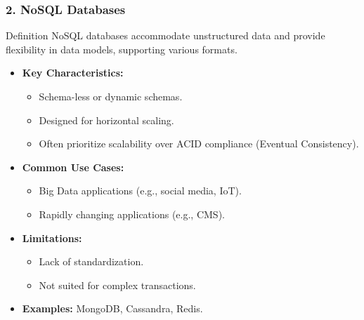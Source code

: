 \documentclass[aspectratio=169]{beamer}
\begin{document}
\begin{frame}[fragile]
    \frametitle{2. NoSQL Databases}
    \begin{block}{Definition}
        NoSQL databases accommodate unstructured data and provide flexibility in data models, supporting various formats.
    \end{block}
    \begin{itemize}
        \item \textbf{Key Characteristics:}
        \begin{itemize}
            \item Schema-less or dynamic schemas.
            \item Designed for horizontal scaling.
            \item Often prioritize scalability over ACID compliance (Eventual Consistency).
        \end{itemize}
        \item \textbf{Common Use Cases:}
        \begin{itemize}
            \item Big Data applications (e.g., social media, IoT).
            \item Rapidly changing applications (e.g., CMS).
        \end{itemize}
        \item \textbf{Limitations:}
        \begin{itemize}
            \item Lack of standardization.
            \item Not suited for complex transactions.
        \end{itemize}
        \item \textbf{Examples:} MongoDB, Cassandra, Redis.
    \end{itemize}
\end{frame}
\end{document}
